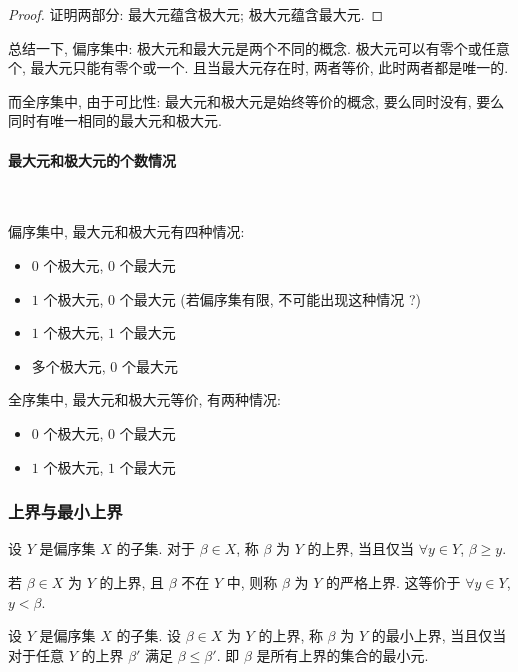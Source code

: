 \documentclass[UTF8]{ctexart}
\theoremstyle{mystyle}
\theoremstyle{myremark}
\theoremstyle{plain}
\begin{document}
\begin{proof} 
    证明两部分: 最大元蕴含极大元; 极大元蕴含最大元.


    
\end{proof}

总结一下, 偏序集中: 极大元和最大元是两个不同的概念. 极大元可以有零个或任意个, 最大元只能有零个或一个. 且当最大元存在时, 两者等价, 此时两者都是唯一的.

而全序集中, 由于可比性: 最大元和极大元是始终等价的概念, 要么同时没有, 要么同时有唯一相同的最大元和极大元.

\paragraph{最大元和极大元的个数情况} \ 

偏序集中, 最大元和极大元有四种情况:
\begin{itemize}
    \item $ 0 $ 个极大元, $ 0 $ 个最大元
    \item $ 1 $ 个极大元, $ 0 $ 个最大元 (若偏序集有限, 不可能出现这种情况 ?)
    \item $ 1 $ 个极大元, $ 1 $ 个最大元
    \item 多个极大元, $ 0 $ 个最大元
\end{itemize}

全序集中, 最大元和极大元等价, 有两种情况:
\begin{itemize}
    \item $ 0 $ 个极大元, $ 0 $ 个最大元
    \item $ 1 $ 个极大元, $ 1 $ 个最大元
\end{itemize}


\subsubsection{上界与最小上界}
\begin{definition}
    设 $ Y $ 是偏序集 $ X $ 的子集. 对于 $ \beta \in X $, 称 $ \beta $ 为 $ Y $ 的上界, 当且仅当 $ \forall y \in Y $, $ \beta \ge y $.
\end{definition}

若 $ \beta \in X $ 为 $ Y $ 的上界, 且 $ \beta $ 不在 $ Y $ 中, 则称 $ \beta $ 为 $ Y $ 的严格上界. 这等价于 $ \forall y \in Y $, $ y < \beta $.

\begin{definition}
    设 $ Y $ 是偏序集 $ X $ 的子集. 设 $ \beta \in X $ 为 $ Y $ 的上界, 称 $ \beta $ 为 $ Y $ 的最小上界, 当且仅当对于任意 $ Y $ 的上界 $ \beta' $ 满足 $ \beta \le \beta' $. 即 $ \beta $ 是所有上界的集合的最小元.
\end{definition}
\end{document}
